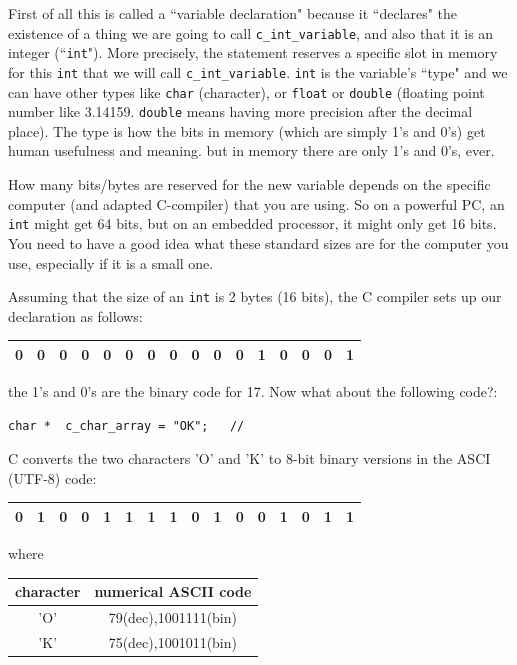 First of all this is called a ``variable declaration" because it ``declares" the existence
of a thing we are going to call {\tt c\_int\_variable}, and also that it is an 
integer (``{\tt int}").  More precisely, the statement reserves a specific slot in memory
for this {\tt int} that we will call  {\tt c\_int\_variable}. {\tt int} is the variable's ``type" and we can have other types like
{\tt char} (character), or {\tt float} or {\tt double} (floating point number like 3.14159. {\tt double} means having more precision after the decimal place).  The type is 
how the bits in memory (which are simply 1's and 0's) get human usefulness and meaning.  but 
in memory there are only 1's and 0's, ever.

How many bits/bytes are reserved for the new variable depends on the specific computer 
(and adapted C-compiler) that you are using.   So on a powerful PC, an {\tt int} might
get 64 bits, but on an embedded processor, it might only get 16 bits.   
You need to have a good idea what these standard sizes are for the computer you use,
especially if it is a small one. 

Assuming that the size of an {\tt int} is 2 bytes (16 bits), the C compiler sets up our 
declaration as follows:

\vspace{0.1in}

\begin{tabular}{|c|c|c|c|c|c|c|c|c|c|c|c|c|c|c|c|}\hline
0&0&0&0&0&0&0&0&0&0&0&1&0&0&0&1\\\hline
\end{tabular}

\vspace{0.1in}
the 1's and 0's are the binary code for 17.  Now what about the following code?:

\begin{verbatim}
char *  c_char_array = "OK";   // 
\end{verbatim}
C converts the two characters 'O' and 'K' to 8-bit binary versions in the ASCI (UTF-8) code:

\vspace{0.1in}
\begin{tabular}{|c|c|c|c|c|c|c|c|c|c|c|c|c|c|c|c|}\hline
0&1&0&0 & 1&1&1&1 & 0&1&0&0 & 1&0&1&1\\\hline
\end{tabular}
\vspace{0.1in}
where 

\begin{tabular}{|c|c|} \hline
character  & numerical ASCII code \\ \hline
'O'  & 79(dec),1001111(bin) \\ \hline
'K'  & 75(dec),1001011(bin) \\ \hline
\end{tabular}

